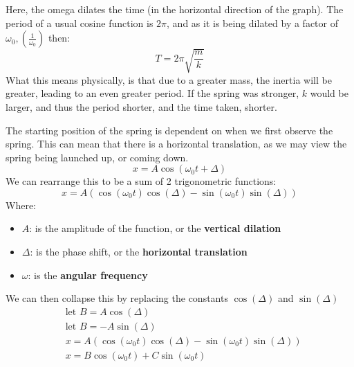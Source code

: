 \documentclass[10pt]{report}
\begin{document}
{{Here, the omega dilates the time (in the horizontal direction of the graph). The period of a usual cosine function is $2\pi$, and as it is being dilated by a factor of $\omega_{0}, \left(\frac{1}{\omega_{0}}\right)$ then: \[
T=2\pi\sqrt{\frac{m}{k}}
\] What this means physically, is that due to a greater mass, the inertia will be greater, leading to an even greater period. If the spring was stronger, $k$ would be larger, and thus the period shorter, and the time taken, shorter.

The starting position of the spring is dependent on when we first observe the spring. This can mean that there is a horizontal translation, as we may view the spring being launched up, or coming down. \[
x=A\cos\left(\omega_{0}t+\Delta\right)
\] We can rearrange this to be a sum of 2 trigonometric functions: \[
x=A\left(\cos\left(\omega_{0}t\right)\cos\left(\Delta\right)-\sin\left(\omega_{0}t\right)\sin\left(\Delta\right)\right)
\] Where:
\begin{itemize}
	\item{$A$: is the amplitude of the function, or the \textbf{vertical dilation}}
	\item{$\Delta$: is the phase shift, or the \textbf{horizontal translation}}
	\item{$\omega$: is the \textbf{angular frequency}}
\end{itemize}
We can then collapse this by replacing the constants $\cos\left(\Delta\right)$ and $\sin\left(\Delta\right)$ 
\begin{align*}
	& \text{let } B=A\cos\left(\Delta\right) \\
	& \text{let } B=-A\sin\left(\Delta\right) \\
	& x=A\left(\cos\left(\omega_{0}t\right)\cos\left(\Delta\right)-\sin\left(\omega_{0}t\right)\sin\left(\Delta\right)\right) \\
	& x=B\cos\left(\omega_{0}t\right)+C\sin\left(\omega_{0}t\right)
\end{align*}}
}
\end{document}
